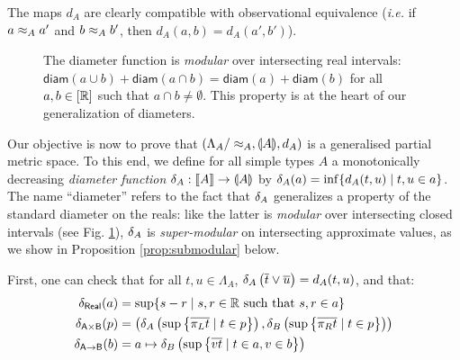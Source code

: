 The maps $d_{A}$ are clearly compatible with observational equivalence (\textit{i.e.} if $a \approx_A a'$ and $b \approx_A b'$, then $d_A(a,b) = d_A(a',b')$). 


\begin{figure}
\caption{\small The diameter function is \emph{modular} over intersecting real intervals: 
$\mathsf{diam}(a\cup  b)+\mathsf{diam}(a\cap b)=\mathsf{diam}(a)+\mathsf{diam}(b)$ for all $a,b\in [\mathbb{R}]$ such that $a\cap b\neq \emptyset$.
This property is at the heart of our generalization of diameters.}
\label{fig:modular}
\end{figure}


Our objective is now to prove that $\left(\Lambda_A/\approx_A, \llparenthesis A \rrparenthesis, d_A\right)$ is a generalised partial metric space.
To this end, we define for all simple types $A$ a monotonically decreasing \emph{diameter function} $\delta_A : \llbracket A \rrbracket \to \llparenthesis A \rrparenthesis$ by $\delta_A(a) = \inf \{ d_A(t,u) \mid t,u \in a \}$. The name ``diameter'' refers to the fact that $\delta_{A}$ generalizes a property of the standard diameter on the reals: like the latter is \emph{modular} over intersecting closed intervals (see Fig. \ref{fig:modular}), $\delta_{A}$ is \emph{super-modular} on intersecting approximate values, as we show in Proposition \ref{prop:submodular} below. 
 
 
 First, one can check that for all $t,u \in \Lambda_A$, $\delta_A\left(\overline{t} \vee \overline{u}\right) = d_A(t,u)$, and that:
\begin{align*}
\delta_\mathsf{Real}(a)  & = \sup\{s-r \mid s,r \in \mathbb{R} \text{ such that } s,r \in a\} \\ 
\delta_\mathsf{A \times B}(p) & = \left(\delta_A\left(\sup\left\{\overline{\pi_L t} \mid t \in p\right\}\right),\delta_B\left(\sup\left\{\overline{\pi_R t} \mid t \in p\right\}\right)\right) \\
\delta_\mathsf{A \to B}(b) & = a \mapsto \delta_B\left(\sup\left\{\overline{vt} \mid t\in a, v \in b\right\}\right)
\end{align*}

